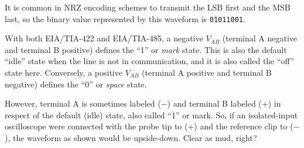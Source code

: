 It is common in NRZ encoding schemes to transmit the LSB first and the MSB last, so the binary value represented by this waveform is {\tt 01011001}.







With both EIA/TIA-422 and EIA/TIA-485, a negative $V_{AB}$ (terminal A negative and terminal B positive) defines the ``1'' or {\it mark} state.  This is also the default ``idle'' state when the line is not in communication, and it is also called the ``off'' state here.  Conversely, a positive $V_{AB}$ (terminal A positive and terminal B negative) defines the ``0'' or {\it space} state.  

However, terminal A is sometimes labeled ($-$) and terminal B labeled (+) in respect of the default (idle) state, also called ``1'' or mark.  So, if an isolated-input oscilloscope were connected with the probe tip to (+) and the reference clip to ($-$), the waveform as shown would be upside-down.  Clear as mud, right?




